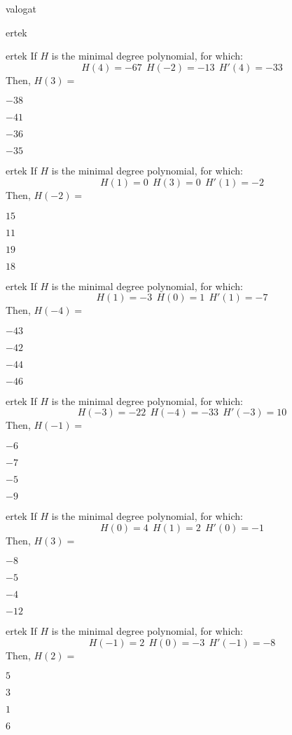 \documentclass[12pt]{article}
\begin{document}
\begin{quiz}{valogat}
\begin{multi}{ertek}
\end{multi}
\begin{multi}{ertek}
If $H$ is the minimal degree polynomial, for which:
$$
H(4)=-67 \ \  H(-2)=-13 \ \ H'(4)=-33
$$
Then, $H(3)=$
\item* $ -38 $
\item  $ -41 $
\item  $ -36 $
\item  $ -35 $
\end{multi}
\begin{multi}{ertek}
If $H$ is the minimal degree polynomial, for which:
$$
H(1)=0 \ \  H(3)=0 \ \ H'(1)=-2
$$
Then, $H(-2)=$
\item* $ 15 $
\item  $ 11 $
\item  $ 19 $
\item  $ 18 $
\end{multi}
\begin{multi}{ertek}
If $H$ is the minimal degree polynomial, for which:
$$
H(1)=-3 \ \  H(0)=1 \ \ H'(1)=-7
$$
Then, $H(-4)=$
\item* $ -43 $
\item  $ -42 $
\item  $ -44 $
\item  $ -46 $
\end{multi}
\begin{multi}{ertek}
If $H$ is the minimal degree polynomial, for which:
$$
H(-3)=-22 \ \  H(-4)=-33 \ \ H'(-3)=10
$$
Then, $H(-1)=$
\item* $ -6 $
\item  $ -7 $
\item  $ -5 $
\item  $ -9 $
\end{multi}
\begin{multi}{ertek}
If $H$ is the minimal degree polynomial, for which:
$$
H(0)=4 \ \  H(1)=2 \ \ H'(0)=-1
$$
Then, $H(3)=$
\item* $ -8 $
\item  $ -5 $
\item  $ -4 $
\item  $ -12 $
\end{multi}
\begin{multi}{ertek}
If $H$ is the minimal degree polynomial, for which:
$$
H(-1)=2 \ \  H(0)=-3 \ \ H'(-1)=-8
$$
Then, $H(2)=$
\item* $ 5 $
\item  $ 3 $
\item  $ 1 $
\item  $ 6 $

\end{multi}
\end{quiz}
\end{document}
